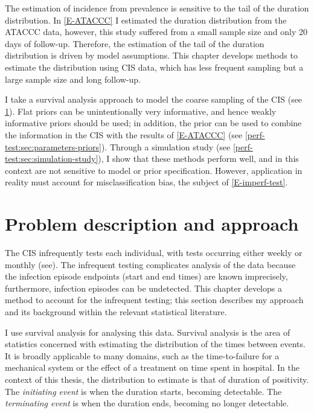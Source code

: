 \documentclass[thesis.tex]{subfiles}
\begin{document}
The estimation of incidence from prevalence is sensitive to the tail of the duration distribution.
In \cref{E-ATACCC} I estimated the duration distribution from the ATACCC data, however, this study suffered from a small sample size and only 20 days of follow-up.
Therefore, the estimation of the tail of the duration distribution is driven by model assumptions.
This chapter develops methods to estimate the distribution using CIS data, which has less frequent sampling but a large sample size and long follow-up.

I take a survival analysis approach to model the coarse sampling of the CIS (see \cref{perf-test:sec:problem}).
Flat priors can be unintentionally very informative, and hence weakly informative priors should be used; in addition, the prior can be used to combine the information in the CIS with the results of \cref{E-ATACCC} (see \cref{perf-test:sec:parameters-priors}).
Through a simulation study (see \cref{perf-test:sec:simulation-study}), I show that these methods perform well, and in this context are not sensitive to model or prior specification.
However, application in reality must account for misclassification bias, the subject of \cref{E-imperf-test}.

\section{Problem description and approach} \label{perf-test:sec:problem}

The CIS infrequently tests each individual, with tests occurring either weekly or monthly (see).
The infrequent testing complicates analysis of the data because the infection episode endpoints (start and end times) are known imprecisely, furthermore, infection episodes can be undetected.
This chapter develops a method to account for the infrequent testing; this section describes my approach and its background within the relevant statistical literature.

I use survival analysis for analysing this data.
Survival analysis is the area of statistics concerned with estimating the distribution of the times between events.
It is broadly applicable to many domains, such as the time-to-failure for a mechanical system or the effect of a treatment on time spent in hospital.
In the context of this thesis, the distribution to estimate is that of duration of positivity.
The \emph{initiating event} is when the duration starts, \ie becoming detectable.
The \emph{terminating event} is when the duration ends, \ie becoming no longer detectable.
\end{document}
